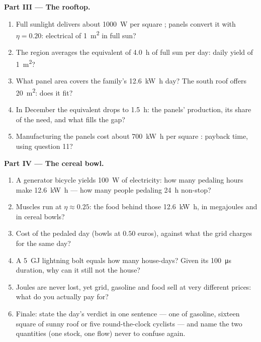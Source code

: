 \begin{problem}
\medskip
\noindent\textbf{Part III --- The rooftop.}
\begin{enumerate}[resume]
  \item Full sunlight delivers about \qty{1000}{W} per square
        ; panels convert it with $\eta = 0.20$: electrical
         of \qty{1}{m^2} in full sun?
  \item The region averages the equivalent of \qty{4.0}{h} of full
        sun per day: daily yield of \qty{1}{m^2}?
  \item What panel area covers the family's \qty{12.6}{kW.h} day?
        The south roof offers \qty{20}{m^2}: does it fit?
  \item In December the equivalent drops to \qty{1.5}{h}: the
        panels' production, its share of the need, and what fills
        the gap?
  \item Manufacturing the panels cost about \qty{700}{kW.h} per
        square :  payback time, using question 11?
\end{enumerate}

\medskip
\noindent\textbf{Part IV --- The cereal bowl.}
\begin{enumerate}[resume]
  \item A generator bicycle yields \qty{100}{W} of electricity:
        how many pedaling hours make \qty{12.6}{kW.h} --- how many
        people pedaling \qty{24}{h} non-stop?
  \item Muscles run at $\eta \approx 0.25$: the food  behind
        those \qty{12.6}{kW.h}, in megajoules and in cereal bowls?
  \item Cost of the pedaled day (bowls at $0.50$ euros), against
        what the grid charges for the same day?
  \item A \qty{5}{GJ} lightning bolt equals how many house-days?
        Given its \qty{100}{\micro s} duration, why can it still
        not  the house?
  \item Joules are never lost, yet grid, gasoline and food 
        sell at very different prices: what do you actually pay for?
  \item Finale: state the day's verdict in one sentence --- one
         of gasoline, sixteen square  of sunny roof or
        five round-the-clock cyclists --- and name the two quantities
        (one stock, one flow) never to confuse again.
\end{enumerate}
\end{problem}
